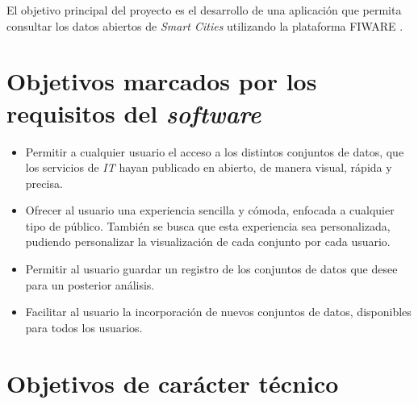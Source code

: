 \begin{comment}
Este apartado explica de forma precisa y concisa cuales son los objetivos que se persiguen con la realización del proyecto. Se puede distinguir entre los objetivos marcados por los requisitos del software a construir y los objetivos de carácter técnico que plantea a la hora de llevar a la práctica el proyecto.
\end{comment}

El objetivo principal del proyecto es el desarrollo de una aplicación que permita consultar los datos abiertos de \textit{Smart Cities} utilizando la plataforma FIWARE \cite{fiware}. 

\section{Objetivos marcados por los requisitos del \textit{software}}\label{objetivos-generales}

\begin{itemize}
\tightlist
\item
  Permitir a cualquier usuario el acceso a los distintos conjuntos de datos, que los servicios de \textit{IT} hayan publicado en abierto, de manera visual, rápida y precisa.
\item
  Ofrecer al usuario una experiencia sencilla y cómoda, enfocada a cualquier tipo de público. También se busca que esta experiencia sea personalizada, pudiendo personalizar la visualización de cada conjunto por cada usuario.
\item
  Permitir al usuario guardar un registro de los conjuntos de datos que desee para un posterior análisis.
\item
  Facilitar al usuario la incorporación de nuevos conjuntos de datos, disponibles para todos los usuarios.
\end{itemize}


\section{Objetivos de carácter técnico}\label{objetivos-personales}

